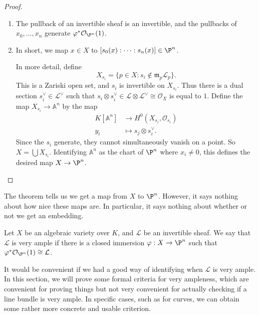 \documentclass[a4paper]{article}
\newcommand\A{\mathbb{A}}
\begin{document}
\begin{proof}\leavevmode
  \begin{enumerate}
    \item The pullback of an invertible sheaf is an invertible, and the pullbacks of $x_0, \ldots, x_n$ generate $\varphi^* \mathcal{O}_{\P^n}(1)$.

    \item In short, we map $x \in X$ to $[s_0(x): \cdots : s_n(x)] \in \P^n$.

      In more detail, define
      \[
        X_{s_i} = \{p \in X: s_i \not\in \mathfrak{m}_p \mathcal{L}_p\}.
      \]
      This is a Zariski open set, and $s_i$ is invertible on $X_{s_i}$. Thus there is a dual section $s_i^\vee \in \mathcal{L}^{\vee}$ such that $s_i \otimes s_i^\vee \in \mathcal{L} \otimes \mathcal{L}^\vee \cong \mathcal{O}_X$ is equal to $1$. Define the map $X_{s_i} \to \A^n$ by the map
      \begin{align*}
        K[\A^n] &\to H^0(X_{s_i}, \mathcal{O}_{s_i})\\
        y_i &\mapsto s_j \otimes s_i^\vee.
      \end{align*}
      Since the $s_i$ generate, they cannot simultaneously vanish on a point. So $X = \bigcup X_{s_i}$. Identifying $\A^n$ as the chart of $\P^n$ where $x_i \not= 0$, this defines the desired map $X \to \P^n$.\qedhere
  \end{enumerate}
\end{proof}

The theorem tells us we get a map from $X$ to $\P^n$. However, it says nothing about how nice these maps are. In particular, it says nothing about whether or not we get an embedding.

\begin{defi}
  Let $X$ be an algebraic variety over $K$, and $\mathcal{L}$ be an invertible sheaf. We say that $\mathcal{L}$ is very ample if there is a closed immersion $\varphi: X \to \P^n$ such that $\varphi^* \mathcal{O}_{\P^n}(1) \cong \mathcal{L}$.
\end{defi}
It would be convenient if we had a good way of identifying when $\mathcal{L}$ is very ample. In this section, we will prove some formal criteria for very ampleness, which are convenient for proving things but not very convenient for actually checking if a line bundle is very ample. In specific cases, such as for curves, we can obtain some rather more concrete and usable criterion.
\end{document}
